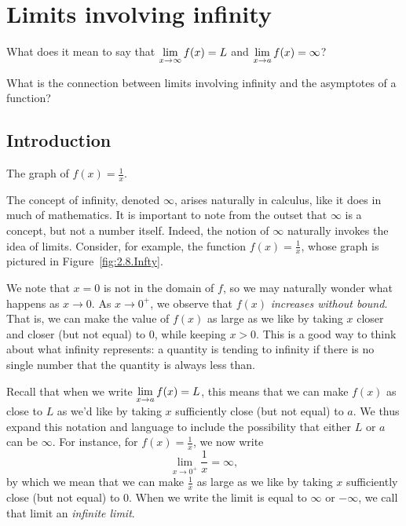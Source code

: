 \section{Limits involving infinity}\label{S:1.2.Infinity}

\begin{goals}
\item What does it mean to say that $\displaystyle \lim_{x \to \infty} f(x) = L$ and $\displaystyle \lim_{x \to a} f(x) = \infty$?
\item What is the connection between limits involving infinity and the asymptotes of a function?
\end{goals}

\subsection{Introduction}

\begin{marginfigure}[2.25in]
\caption{The graph of $f(x) = \frac{1}{x}$.} \label{fig:2.8.Infty}
\end{marginfigure}

The concept of infinity, denoted $\infty$, arises naturally in calculus, like it does in much of mathematics.  It is important to note from the outset that $\infty$ is a concept, but not a number itself.  Indeed, the notion of $\infty$ naturally invokes the idea of limits.  Consider, for example, the function $f(x) = \frac{1}{x}$, whose graph is pictured in Figure~\ref{fig:2.8.Infty}.

We note that $x = 0$ is not in the domain of $f$, so we may naturally wonder what happens as $x \to 0$.  As $x \to 0^+$, we observe that $f(x)$ \emph{increases without bound}.  That is, we can make the value of $f(x)$ as large as we like by taking $x$ closer and closer (but not equal) to $0$, while keeping $x > 0$.  This is a good way to think about what infinity represents:  a quantity is tending to infinity if there is no single number that the quantity is always less than. 

Recall that when we write $\displaystyle \lim_{x \to a} f(x) = L$, this means that we can make $f(x)$ as close to $L$ as we'd like by taking $x$ sufficiently close (but not equal) to $a$.  We thus expand this notation and language to include the possibility that either $L$ or $a$ can be $\infty$.  For instance, for $f(x) = \frac{1}{x}$, we now write
$$\lim_{x \to 0^+} \frac{1}{x} = \infty,$$
by which we mean that we can make $\frac{1}{x}$ as large as we like by taking $x$ sufficiently close (but not equal) to $0$.  When we write the limit is equal to $\infty$ or $-\infty$, we call that limit an {\em infinite limit}.

